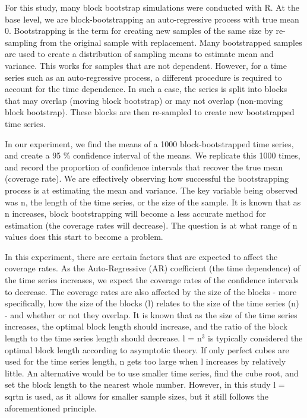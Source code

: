 \documentclass[12pt, letterpaper, titlepage]{article}
\begin{document}
For this study, many block bootstrap simulations were conducted with R. At the base
level, we are block-bootstrapping an auto-regressive process with true mean 0.
Bootstrapping is the term for creating new samples of the same size by re-sampling from
the original sample with replacement. Many bootstrapped samples are used to create a
distribution of sampling means to estimate mean and variance. This works for samples
that are not dependent. However, for a time series such as an auto-regressive process,
a different procedure is required to account for the time dependence. In such a case,
the series is split into blocks that may overlap (moving block bootstrap) or may not
overlap (non-moving block bootstrap). These blocks are then re-sampled to create new
bootstrapped time series. 

In our experiment, we find the means of a 1000 block-bootstrapped time series, 
and create a 95 \% confidence interval of the means. We replicate this 1000 times, 
and record the proportion of confidence intervals that recover the true mean 
(coverage rate). We are effectively observing how successful the bootstrapping process
is at estimating the mean and variance. The key variable being observed was n, 
the length of the time series, or the size of the sample. It is known that as n
increases, block bootstrapping will become a less accurate method for estimation
(the coverage rates will decrease). The question is at what range of n values does this
start to become a problem. 

In this experiment, there are certain factors that are expected to affect the coverage
rates. As the Auto-Regressive (AR) coefficient (the time dependence) of the time series 
increases,
we expect the coverage rates of the confidence intervals to decrease.
The coverage rates are also affected by the size of the blocks - more specifically,
how the size of the blocks (l) relates to the size of the time series (n) - 
and whether or not they overlap. It is known that as the size of the time series 
increases, the optimal block length should increase, and the ratio of the block length to 
the time series length should decrease. l = n$^3$ is typically considered the optimal 
block length according to asymptotic theory. \citep{Buhlmann} If only perfect cubes are used for the time 
series length, n gets too large when l increases by relatively little. An alternative 
would be to use smaller time series, find the cube root, and set the block length to the 
nearest whole number. However, in this study l = sqrt{n} is used, as it allows for smaller 
sample sizes, but it still follows the aforementioned principle.
\end{document}

